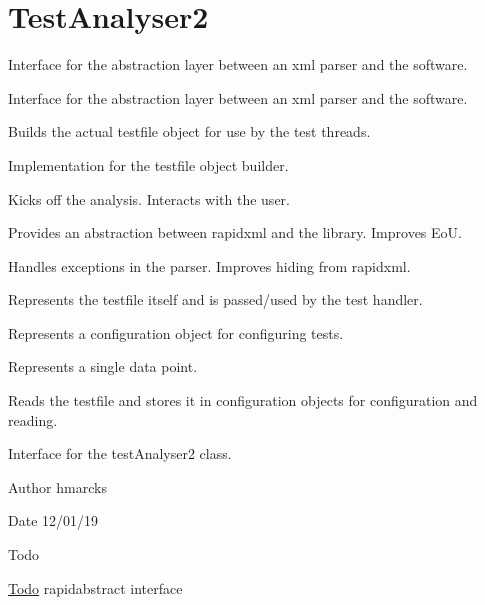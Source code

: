 \hypertarget{group__testAnalyser2}{}\section{Test\+Analyser2}
\label{group__testAnalyser2}


Interface for the abstraction layer between an xml parser and the software.  


Interface for the abstraction layer between an xml parser and the software. 

Builds the actual testfile object for use by the test threads.

Implementation for the testfile object builder.

Kicks off the analysis. Interacts with the user.

Provides an abstraction between rapidxml and the library. Improves EoU.

Handles exceptions in the parser. Improves hiding from rapidxml.

Represents the testfile itself and is passed/used by the test handler.

Represents a configuration object for configuring tests.

Represents a single data point.

Reads the testfile and stores it in configuration objects for configuration and reading.

Interface for the test\+Analyser2 class.

\begin{DoxyAuthor}{Author}
hmarcks
\end{DoxyAuthor}
\begin{DoxyDate}{Date}
12/01/19
\end{DoxyDate}
\begin{DoxyRefDesc}{Todo}
\item[\mbox{\hyperlink{todo__todo000024}{Todo}}]rapidabstract interface \end{DoxyRefDesc}


